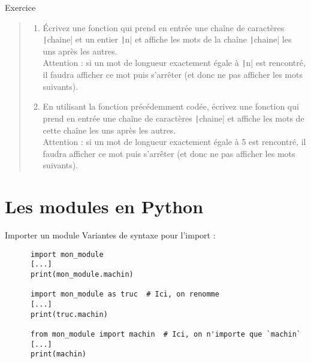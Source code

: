 \documentclass[10pt]{beamer}
\begin{document}
\begin{frame}{Exercice}
  \begin{quote}
    \begin{enumerate}
      \item Écrivez une fonction qui prend en entrée une chaîne de caractères \texttt|chaine| et un entier \texttt|n| et affiche les mots de la chaîne \texttt|chaine| les uns après les autres. \\ Attention : si un mot de longueur exactement égale à \texttt|n| est rencontré, il faudra afficher ce mot puis s'arrêter (et donc ne pas afficher les mots suivants).
      \item En utilisant la fonction précédemment codée, écrivez une fonction qui prend en entrée une chaîne de caractères \texttt|chaine| et affiche les mots de cette chaîne les uns après les autres. \\ Attention : si un mot de longueur exactement égale à \alert{5} est rencontré, il faudra afficher ce mot puis s'arrêter (et donc ne pas afficher les mots suivants).
    \end{enumerate}
  \end{quote}
\end{frame}

\section{Les modules en Python}

\begin{frame}[fragile]{Importer un module}  
  Variantes de syntaxe pour l'import :

  \begin{beamercodeblock}
    \begin{verbatim}
      import mon_module
      [...]
      print(mon_module.machin)

      import mon_module as truc  # Ici, on renomme
      [...]
      print(truc.machin)

      from mon_module import machin  # Ici, on n'importe que `machin`
      [...]
      print(machin)
    \end{verbatim}
  \end{beamercodeblock}
\end{frame}
\end{document}
